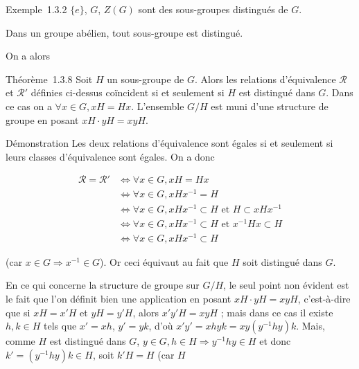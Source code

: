Exemple~1.3.2 $\{e\}$, $G$, $Z(G)$ sont des
sous-groupes distingués de $G$.

Dans un groupe abélien, tout sous-groupe est distingué.

On a alors

Théorème~1.3.8 Soit $H$ un sous-groupe de $G$. Alors les relations
d'équivalence $\mathcal{R}$ et $\mathcal{R}'$ définies ci-dessus coïncident si et seulement si
$H$ est distingué dans $G$. Dans ce cas on a $\forall x \in G, xH = Hx$. L'ensemble $G/H$ est muni d'une structure de groupe en posant
$xH \cdot yH = xyH$.

Démonstration Les deux relations d'équivalence sont égales si et
seulement si leurs classes d'équivalence sont égales. On a donc

\begin{align*} 
\mathcal{R} = \mathcal{R}' &\Leftrightarrow \forall x \in G, xH = Hx \\
&\Leftrightarrow \forall x \in G, xHx^{-1} = H \\
&\Leftrightarrow \forall x \in G, xHx^{-1} \subset H \text{ et } H \subset xHx^{-1} \\
&\Leftrightarrow \forall x \in G, xHx^{-1} \subset H \text{ et } x^{-1}Hx \subset H \\
&\Leftrightarrow \forall x \in G, xHx^{-1} \subset H
\end{align*}

(car $x \in G \Rightarrow x^{-1} \in G$). Or ceci équivaut au fait que $H$ soit
distingué dans $G$.

En ce qui concerne la structure de groupe sur $G/H$, le seul point non
évident est le fait que l'on définit bien une application en posant
$xH \cdot yH = xyH$, c'est-à-dire que si $xH = x'H$ et $yH = y'H$, alors $x'y'H =
xyH$ ; mais dans ce cas il existe $h,k \in H$ tels que $x' = xh$, $y' = yk$, d'où
$x'y' = xhyk = xy(y^{-1}hy)k$. Mais, comme $H$ est distingué dans
$G$, $y \in G, h \in H \Rightarrow y^{-1}hy \in H$ et donc $k' = (y^{-1}hy)k
\in H$, soit $k'H = H$ (car $H$